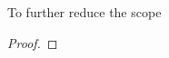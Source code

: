 \begin{definition}
  To further reduce the scope  
\end{definition}

\begin{theorem}
\end{theorem}

\begin{proof}
\end{proof}



